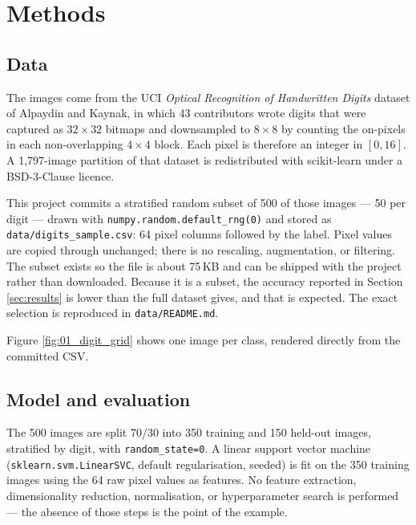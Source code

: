 \section{Methods}
\label{sec:methods}

\subsection{Data}

The images come from the UCI \emph{Optical Recognition of Handwritten Digits}
dataset of Alpaydin and Kaynak, in which 43 contributors wrote digits that were
captured as $32\times32$ bitmaps and downsampled to $8\times8$ by counting the
on-pixels in each non-overlapping $4\times4$ block. Each pixel is therefore an
integer in $[0, 16]$. A 1{,}797-image partition of that dataset is redistributed
with scikit-learn under a BSD-3-Clause licence.

This project commits a stratified random subset of 500 of those images --- 50
per digit --- drawn with \texttt{numpy.random.default\_rng(0)} and stored as
\texttt{data/digits\_sample.csv}: 64 pixel columns followed by the label. Pixel
values are copied through unchanged; there is no rescaling, augmentation, or
filtering. The subset exists so the file is about 75\,KB and can be shipped
with the project rather than downloaded. Because it is a subset, the accuracy
reported in Section \ref{sec:results} is lower than the full dataset gives, and
that is expected. The exact selection is reproduced in \texttt{data/README.md}.

Figure \ref{fig:01_digit_grid} shows one image per class, rendered directly
from the committed CSV.

\subsection{Model and evaluation}

The 500 images are split 70/30 into 350 training and 150 held-out images,
stratified by digit, with \texttt{random\_state=0}. A linear support vector
machine (\texttt{sklearn.svm.LinearSVC}, default regularisation, seeded) is fit
on the 350 training images using the 64 raw pixel values as features. No
feature extraction, dimensionality reduction, normalisation, or hyperparameter
search is performed --- the absence of those steps is the point of the example.

